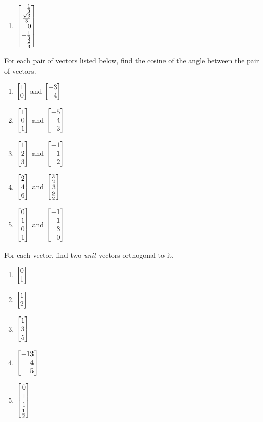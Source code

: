 \begin{exercises}
\begin{problist}
\begin{enumerate}
			\item $\mat{\frac{1}{3}\\\frac{\sqrt{3}}{3}\\0\\-\frac{1}{3}\\\frac{2}{3}}$
		\end{enumerate}
		\prob For each pair of vectors listed below, find the cosine of the angle between the pair of vectors.
		\begin{enumerate}
			\item $\mat{1\\0}$ and $\mat{-3\\4}$
			\item $\mat{1\\0\\1}$ and $\mat{-5\\4\\-3}$
			\item $\mat{1\\2\\3}$ and $\mat{-1\\-1\\2}$
			\item $\mat{2\\4\\6}$ and $\mat{\frac{3}{2}\\3\\\frac{9}{2}}$
			\item $\mat{0\\1\\0\\1}$ and $\mat{-1\\1\\3\\0}$
		\end{enumerate}
		\prob For each vector, find two \emph{unit} vectors orthogonal to it.
		\begin{enumerate}
			\item $\mat{0\\1}$
			\item $\mat{1\\2}$
			\item $\mat{1\\3\\5}$
			\item $\mat{-13\\-4\\5}$
			\item $\mat{0\\1\\1\\\frac{1}{2}}$
		\end{enumerate}


\end{problist}
\end{exercises}
